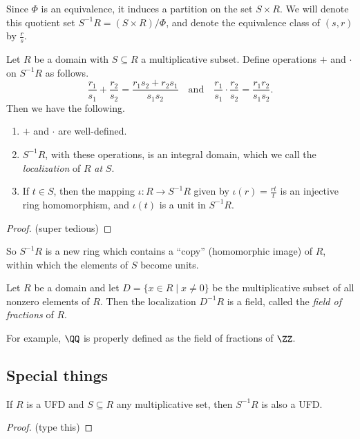 \documentclass{article}
\begin{document}
Since $\Phi$ is an equivalence, it induces a partition on the set $S \times R$. We will denote this quotient set $S^{-1}R = (S \times R)/\Phi$, and denote the equivalence class of $(s,r)$ by $\frac{r}{s}$.

\begin{prop}
Let $R$ be a domain with $S \subseteq R$ a multiplicative subset. Define operations $+$ and $\cdot$ on $S^{-1}R$ as follows. \[ \frac{r_1}{s_1} + \frac{r_2}{s_2} = \frac{r_1s_2 + r_2s_1}{s_1s_2} \quad \mathrm{and} \quad \frac{r_1}{s_1} \cdot \frac{r_2}{s_2} = \frac{r_1r_2}{s_1s_2}. \] Then we have the following.
\begin{enumerate}
\item $+$ and $\cdot$ are well-defined.
\item $S^{-1}R$, with these operations, is an integral domain, which we call the \emph{localization} of $R$ \emph{at} $S$.
\item If $t \in S$, then the mapping $\iota : R \rightarrow S^{-1}R$ given by $\iota(r) = \frac{rt}{t}$ is an injective ring homomorphism, and $\iota(t)$ is a unit in $S^{-1}R$.
\end{enumerate}
\end{prop}

\begin{proof}
(super tedious)
\end{proof}

So $S^{-1}R$ is a new ring which contains a ``copy'' (homomorphic image) of $R$, within which the elements of $S$ become units.

\begin{dfn}
Let $R$ be a domain and let $D = \{ x \in R \mid x \neq 0 \}$ be the multiplicative subset of all nonzero elements of $R$. Then the localization $D^{-1}R$ is a field, called the \emph{field of fractions} of $R$.
\end{dfn}

For example, $\QQ$ is properly defined as the field of fractions of $\ZZ$.

\subsection*{Special things}

\begin{prop}
If $R$ is a UFD and $S \subseteq R$ any multiplicative set, then $S^{-1}R$ is also a UFD.
\end{prop}

\begin{proof}
(type this)
\end{proof}
\end{document}
